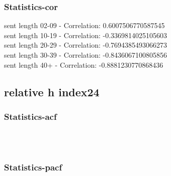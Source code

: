 \documentclass{article}%
\begin{document}
%
\newpage%
\subsubsection{Statistics{-}cor}%
\label{ssubsec:Statistics{-}cor}%
\noindent%
sent length 02-09 - Correlation: 0.6007506770587545\\%
sent length 10-19 - Correlation: -0.3369814025105603\\%
sent length 20-29 - Correlation: -0.7694385493066273\\%
sent length 30-39 - Correlation: -0.8436067100805856\\%
sent length 40+ - Correlation: -0.8881230770868436\\

%
\newpage

%
\subsection{relative h index24}%
\label{subsec:relativehindex24}%
\subsubsection{Statistics{-}acf}%
\label{ssubsec:Statistics{-}acf}%


\begin{figure}[ht]%
\centering%
\setlength{\abovecaptionskip}{-35pt}%
%
%
\\%
%
%
\\%
%
\end{figure}

%
\newpage%
\subsubsection{Statistics{-}pacf}%
\label{ssubsec:Statistics{-}pacf}%
\end{document}
